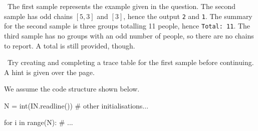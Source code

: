 
\Explanation\ The first sample represents the example given in the question. The second
sample has odd chains $[5,3]$ and $[3]$, hence the output \texttt{2} and \texttt{1}. The
summary for the second sample is three groups totalling 11 people, hence \texttt{Total:\ 11}.
The third sample has no groups with an odd number of people, so there are no chains to
report. A total is still provided, though.

\Scratch\ Try creating and completing a trace table for the first sample before
continuing. A hint is given over the page.

\clearpage %

We assume the code structure shown below.
\begin{pythoncode}
  N = int(IN.readline())
  # other initialisations...

  for i in range(N):
    # ...
\end{pythoncode}

